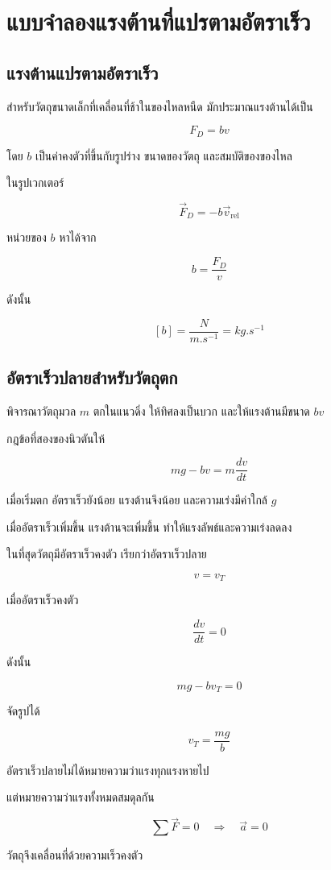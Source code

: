 \section{แบบจำลองแรงต้านที่แปรตามอัตราเร็ว}

\subsection{แรงต้านแปรตามอัตราเร็ว}

สำหรับวัตถุขนาดเล็กที่เคลื่อนที่ช้าในของไหลหนืด
มักประมาณแรงต้านได้เป็น

\[
\boxed{
F_D=bv
}
\]

โดย $b$ เป็นค่าคงตัวที่ขึ้นกับรูปร่าง ขนาดของวัตถุ
และสมบัติของของไหล

ในรูปเวกเตอร์

\[
\boxed{
\vec F_D=-b\vec v_{\text{rel}}
}
\]

หน่วยของ $b$ หาได้จาก

\[
b=\frac{F_D}{v}
\]

ดังนั้น

\[
[b]
=
\frac{\si{N}}{\si{m.s^{-1}}}
=
\si{kg.s^{-1}}
\]

\subsection{อัตราเร็วปลายสำหรับวัตถุตก}

พิจารณาวัตถุมวล $m$ ตกในแนวดิ่ง
ให้ทิศลงเป็นบวก และให้แรงต้านมีขนาด $bv$

กฎข้อที่สองของนิวตันให้

\[
mg-bv
=
m\frac{dv}{dt}
\]

เมื่อเริ่มตก อัตราเร็วยังน้อย แรงต้านจึงน้อย
และความเร่งมีค่าใกล้ $g$

เมื่ออัตราเร็วเพิ่มขึ้น แรงต้านจะเพิ่มขึ้น
ทำให้แรงลัพธ์และความเร่งลดลง

ในที่สุดวัตถุมีอัตราเร็วคงตัว เรียกว่าอัตราเร็วปลาย

\[
v=v_T
\]

เมื่ออัตราเร็วคงตัว

\[
\frac{dv}{dt}=0
\]

ดังนั้น

\[
mg-bv_T=0
\]

จัดรูปได้

\[
\boxed{
v_T=\frac{mg}{b}
}
\]

\begin{tcolorbox}[title=หลักสำคัญของอัตราเร็วปลาย]
อัตราเร็วปลายไม่ได้หมายความว่าแรงทุกแรงหายไป

แต่หมายความว่าแรงทั้งหมดสมดุลกัน

\[
\boxed{
\sum \vec F=0
\quad \Rightarrow \quad
\vec a=0
}
\]

วัตถุจึงเคลื่อนที่ด้วยความเร็วคงตัว
\end{tcolorbox}

